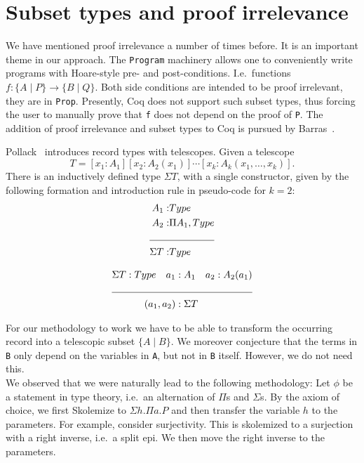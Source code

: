 \documentclass[a4paper,10pt,runningheads]{llncs}
\begin{document}
\section{Subset types and proof irrelevance}\label{PI}
We have mentioned proof irrelevance a number of times before. It is an important theme in our
approach. The \lstinline|Program| machinery allows one to conveniently write programs with Hoare-style
pre- and post-conditions. I.e.\ functions $f: \{ A \mid P \} \to \{ B \mid Q \}$. Both side
conditions
are intended to be proof irrelevant, they are in \lstinline|Prop|. Presently, Coq does not support such subset
types, thus forcing the user to manually prove that \lstinline|f| does not depend on the proof of \lstinline|P|.
The addition of proof irrelevance and subset types to Coq is pursued by
Barras~\cite{Barras:subset,Werner08}. 

Pollack~\cite{pollack2000dependently} introduces record types with telescopes. 
Given a telescope\[
T=[x_1:A_1][x_2:A_2(x_1)]\cdots[x_k:A_k(x_1,\ldots,x_k)].
\]
There is an inductively defined type $\Sigma T$, with a single constructor, given by the following 
formation and introduction rule in pseudo-code for $k=2$:
\begin{align*}
 A_1 :& Type\\
 A_2 :& \Pi A_1,Type\\
\cline{1-2}
\Sigma T :& Type
\end{align*}

\begin{align*}
 \Sigma T:Type\quad a_1 &:A_1 \quad a_2 : A_2(a_1)\\
\cline{1-3}
(a_1,a_2) &: \Sigma T
\end{align*}

For our methodology to work we have to be able to transform the occurring record into a telescopic
subset $\{ A \mid  B\}$. We moreover conjecture that the terms in \lstinline|B| only depend on the
variables in \lstinline|A|, but not in \lstinline|B| itself. However, we do not need this.\\

We observed that we were naturally lead to the following methodology: Let $\phi$ be a statement in type
theory, i.e.\ an alternation of $\Pi$s and $\Sigma$s. By the axiom of choice, we first Skolemize to $\Sigma h. \Pi a.P$ and then transfer the variable $h$ to the parameters. For example, consider surjectivity. This is skolemized to a surjection with a right inverse, i.e.\ a split epi. We then move the right inverse
to the parameters.
\end{document}
